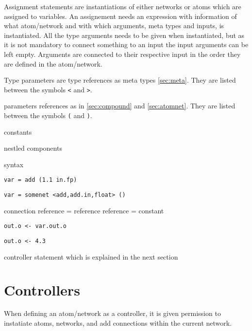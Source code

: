 Assignment statements are instantiations of either networks or atoms
which are assigned to variables. An assignement needs an expression
with information of what atom/network and with which arguments, meta
types and inputs, is instantiated. All the type arguments needs to be
given when instantiated, but as it is not mandatory to connect
something to an input the input arguments can be left empty. Arguments
are connected to their respective input in the order they are defined
in the atom/network.

Type parameters are type references as meta types
\autoref{sec:meta}. They are listed between the symbols \verb#<# and
\verb#>#.

parameters references as in \autoref{sec:compound} and
\autoref{sec:atomnet}. They are listed between the symbols \verb#(#
and \verb#)#.

constants

nestled components

syntax

\begin{verbatim}
var = add (1.1 in.fp)
\end{verbatim}

\begin{verbatim}
var = somenet <add,add.in,float> ()
\end{verbatim}


connection
reference = reference
reference = constant

\begin{verbatim}
out.o <- var.out.o
\end{verbatim}

\begin{verbatim}
out.o <- 4.3
\end{verbatim}


controller statement which is explained in the next section


\section{Controllers}

When defining an atom/network as a controller, it is given permission
to instatiate atoms, networks, and add connections within the current
network.

